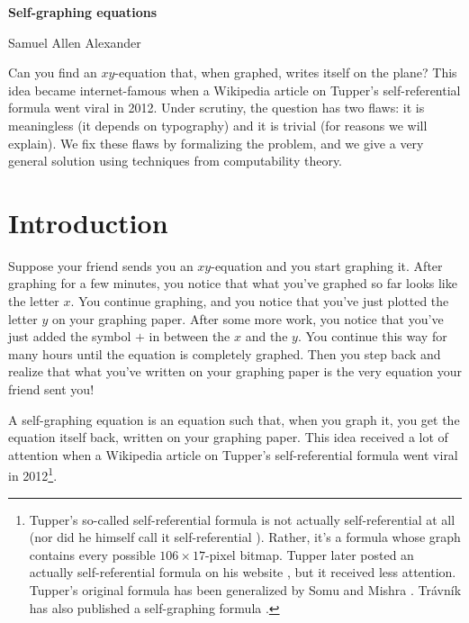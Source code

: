 \documentclass[table, svgnames, dvipsnames, letterpaper, 11pt]{report}
\makeatletter
\theoremstyle{remark}
\def\\{}%
\renewenvironment{abstract}{%
      \@beginparpenalty\@lowpenalty
      \small
      \begin{center}%
        \bfseries \abstractname
        \@endparpenalty\@M
        \vspace*{-0.2in}
      \end{center}\quotation}%
     {\endquotation\par%
     }
\makeatother
\begin{document}

\begin{center}
{\bf \LARGE Self-graphing equations}\\

\medskip


\label{Alexander}

Samuel Allen Alexander
\end{center}

\vspace*{-0.2in}

\begin{abstract}
\noindent
Can you find an $xy$-equation that, when graphed, writes itself on the plane?
This idea became internet-famous when a Wikipedia article on Tupper’s self-referential formula went viral in 2012. Under scrutiny, the question has two flaws: it is meaningless (it depends on typography) and it is trivial (for reasons we will explain). We fix these flaws by formalizing the problem, and we give a very general solution using techniques from computability theory.
\end{abstract}

\section{Introduction}

Suppose your friend sends you an $xy$-equation and you start graphing it.
After graphing for a few minutes, you notice that what you've graphed so far
looks like the letter $x$. You continue graphing, and you notice that you've
just plotted the letter $y$ on your graphing paper.
After some more work, you notice that you've
just added the symbol $+$ in between the $x$ and the $y$.
You continue this way for many hours until the equation is completely graphed.
Then you step back and realize that what you've written on your graphing paper
is the very equation your friend sent you!

A self-graphing equation is an equation such that, when you graph it, you get
the equation itself back, written on your graphing paper. This idea received
a lot of attention when a Wikipedia article on Tupper's self-referential
formula went viral in 2012\footnote{Tupper's so-called self-referential formula
is not actually self-referential at all (nor did he himself call it
self-referential \cite{tupper2001reliable}). Rather, it's a formula whose graph
contains every possible $106\times 17$-pixel bitmap. Tupper later posted an
actually self-referential formula on his website \cite{tupperwebpage},
but it received less attention.
Tupper's original formula has been generalized by Somu
and Mishra \cite{somu2023generalization}.
Tr\'avn\'ik has also published
a self-graphing formula \cite{travnikwebpage}.}.
\end{document}
